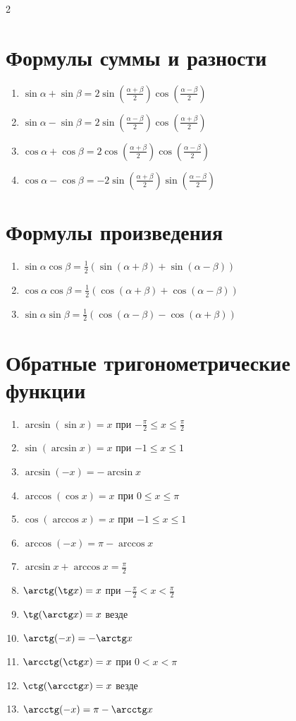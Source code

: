 \documentclass[]{article}
\begin{document}
\begin{multicols}{2}
		\section*{Формулы суммы и разности}
		\begin{enumerate}
			\item $\sin\alpha + \sin\beta = 2\sin(\frac{\alpha + \beta}{2})\cos(\frac{\alpha - \beta}{2})$
			\item $\sin\alpha - \sin\beta = 2\sin(\frac{\alpha - \beta}{2})\cos(\frac{\alpha + \beta}{2})$
			\item $\cos\alpha + \cos\beta = 2\cos(\frac{\alpha + \beta}{2})\cos(\frac{\alpha - \beta}{2})$
			\item $\cos\alpha - \cos\beta = -2\sin(\frac{\alpha + \beta}{2})\sin(\frac{\alpha - \beta}{2})$
		\end{enumerate}
		
		\section*{Формулы произведения}
		\begin{enumerate}
			\item $\sin\alpha\cos\beta = \frac{1}{2}(\sin(\alpha + \beta) + \sin(\alpha - \beta))$
			\item $\cos\alpha\cos\beta = \frac{1}{2}(\cos(\alpha + \beta) + \cos(\alpha - \beta))$
			\item $\sin\alpha\sin\beta = \frac{1}{2}(\cos(\alpha - \beta) - \cos(\alpha + \beta))$
		\end{enumerate}
		
		\section*{Обратные тригонометрические функции}
		\begin{enumerate}
			\item $\arcsin(\sin x) = x$ при $-\frac{\pi}{2} \leq x \leq \frac{\pi}{2}$
			\item $\sin(\arcsin x) = x$ при $-1 \leq x \leq 1$
			\item $\arcsin(-x) = -\arcsin x$
			\item $\arccos(\cos x) = x$ при $0 \leq x \leq \pi$
			\item $\cos(\arccos x) = x$ при $-1 \leq x \leq 1$
			\item $\arccos(-x) = \pi - \arccos x$
			\item $\arcsin x + \arccos x = \frac{\pi}{2}$
			\item $\arctg(\tg x) = x$ при $-\frac{\pi}{2} < x < \frac{\pi}{2}$
			\item $\tg(\arctg x) = x$ везде
			\item $\arctg(-x) = -\arctg x$
			\item $\arcctg(\ctg x) = x$ при $0 < x < \pi$
			\item $\ctg(\arcctg x) = x$ везде
			\item $\arcctg(-x) = \pi - \arcctg x$
		\end{enumerate}
		
	\end{multicols}
\end{document}
